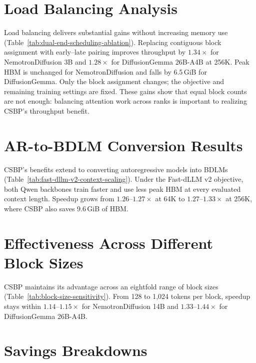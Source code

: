 \section{Load Balancing Analysis}
\label{app:dual-end-scheduling-ablation}

Load balancing delivers substantial gains without increasing memory use
(Table~\ref{tab:dual-end-scheduling-ablation}). Replacing contiguous block
assignment with early--late pairing improves throughput by $1.34\times$ for
NemotronDiffusion 3B and $1.28\times$ for DiffusionGemma 26B-A4B at 256K. Peak
HBM is unchanged for NemotronDiffusion and falls by 6.5\,GiB for DiffusionGemma.
Only the block assignment changes; the objective and
remaining training settings are fixed. These gains show that equal block
counts are not enough: balancing attention work across ranks is important
to realizing CSBP's throughput benefit.



\section{AR-to-BDLM Conversion Results}
\label{app:fast-dllm-v2-results}

CSBP's benefits extend to converting autoregressive models into BDLMs
(Table~\ref{tab:fast-dllm-v2-context-scaling}). Under the Fast-dLLM v2
objective, both Qwen backbones train faster and use less peak HBM at every
evaluated context length. Speedup grows from $1.26$--$1.27\times$ at 64K to
$1.27$--$1.33\times$ at 256K, where CSBP also saves 9.6\,GiB of HBM.



\section{Effectiveness Across Different Block Sizes}
\label{app:block-size-sensitivity}

CSBP maintains its advantage across an eightfold range of block sizes
(Table~\ref{tab:block-size-sensitivity}). From 128 to 1,024 tokens per block,
speedup stays within $1.14$--$1.15\times$ for NemotronDiffusion 14B and
$1.33$--$1.44\times$ for DiffusionGemma 26B-A4B.



\section{Savings Breakdowns}
\label{app:sources-of-speedup}

